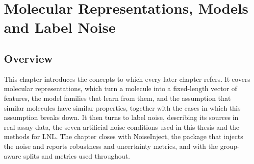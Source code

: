 \chapter{Molecular Representations, Models and Label Noise}\label{chap:background}\label{sec2}

\section{Overview}

This chapter introduces the concepts to which every later chapter refers. It covers molecular representations, which turn a molecule into a fixed-length vector of features, the model families that learn from them, and the assumption that similar molecules have similar properties, together with the cases in which this assumption breaks down. It then turns to label noise, describing its sources in real assay data, the seven artificial noise conditions used in this thesis and the methods for LNL. The chapter closes with NoiseInject, the package that injects the noise and reports robustness and uncertainty metrics, and with the group-aware splits and metrics used throughout.




